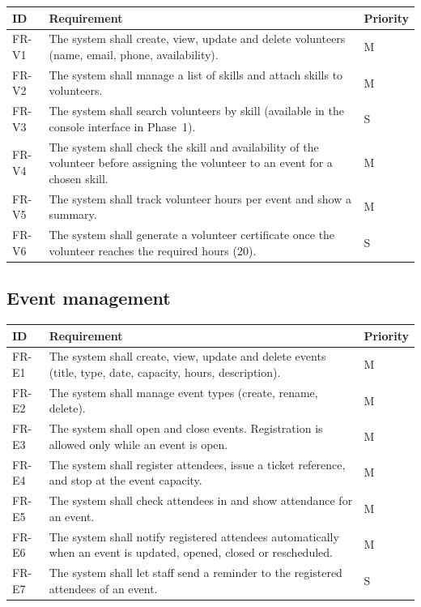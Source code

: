 \begin{center}
\footnotesize
\begin{tabularx}{\textwidth}{@{}L{0.09\textwidth}YL{0.11\textwidth}@{}}
\toprule
\textbf{ID} & \textbf{Requirement} & \textbf{Priority} \\
\midrule
FR-V1 & The system shall create, view, update and delete volunteers (name, email, phone, availability). & M \\
FR-V2 & The system shall manage a list of skills and attach skills to volunteers. & M \\
FR-V3 & The system shall search volunteers by skill (available in the console interface in Phase~1). & S \\
FR-V4 & The system shall check the skill and availability of the volunteer before assigning the volunteer to an event for a chosen skill. & M \\
FR-V5 & The system shall track volunteer hours per event and show a summary. & M \\
FR-V6 & The system shall generate a volunteer certificate once the volunteer reaches the required hours (20). & S \\
\bottomrule
\end{tabularx}
\end{center}

\subsection{Event management}

\begin{center}
\footnotesize
\begin{tabularx}{\textwidth}{@{}L{0.09\textwidth}YL{0.11\textwidth}@{}}
\toprule
\textbf{ID} & \textbf{Requirement} & \textbf{Priority} \\
\midrule
FR-E1 & The system shall create, view, update and delete events (title, type, date, capacity, hours, description). & M \\
FR-E2 & The system shall manage event types (create, rename, delete). & M \\
FR-E3 & The system shall open and close events. Registration is allowed only while an event is open. & M \\
FR-E4 & The system shall register attendees, issue a ticket reference, and stop at the event capacity. & M \\
FR-E5 & The system shall check attendees in and show attendance for an event. & M \\
FR-E6 & The system shall notify registered attendees automatically when an event is updated, opened, closed or rescheduled. & M \\
FR-E7 & The system shall let staff send a reminder to the registered attendees of an event. & S \\
\bottomrule
\end{tabularx}
\end{center}

